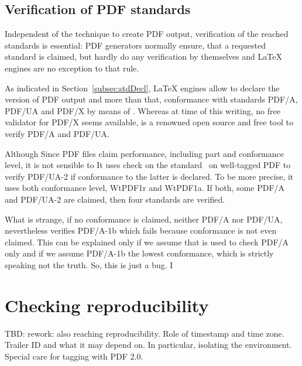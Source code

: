\subsection{Verification of PDF standards}\label{subsec:stdVeri}

Independent of the technique to create PDF output, 
verification of the reached standards is essential: 
PDF generators normally ensure, that a requested standard is claimed, 
but hardly do any verification by themselves and \LaTeX{} engines are no exception to that rule. 

As indicated in Section~\ref{subsec:stdDecl}, 
\LaTeX{} engines allow to declare the version of PDF output and more than that, 
conformance with standards PDF/A, PDF/UA and PDF/X by means of . 
Whereas at time of this writing, no free validator for PDF/X seems available, 
 is a renowned open source and free tool to verify PDF/A and PDF/UA\@. 

Although Since PDF files claim performance, including part and conformance level, 
it is not sensible to 
It uses check on the standard~\cite{WtPDF1} on well-tagged PDF to verify PDF/UA-2 
if conformance to the latter is declared. 
To be more precise, it uses both conformance level, WtPDF1r and WtPDF1a. 
If both, some PDF/A and PDF/UA-2 are claimed, then four standards are verified. 

What is strange, if no conformance is claimed, neither PDF/A nor PDF/UA, 
 nevertheless verifies PDF/A-1b which fails because conformance is not even claimed. 
This can be explained only if we assume that  is used to check PDF/A only 
and if we assume PDF/A-1b the lowest conformance, which is strictly speaking not the truth. 
So, this is just a bug. 
I




\section{Checking reproducibility}\label{sec:chkReprod}

TBD: rework: also reaching reproducibility. 
Role of timestamp and time zone. 
Trailer ID and what it may depend on. 
In particular, isolating the environment. 
Special care for tagging with PDF 2.0. 

